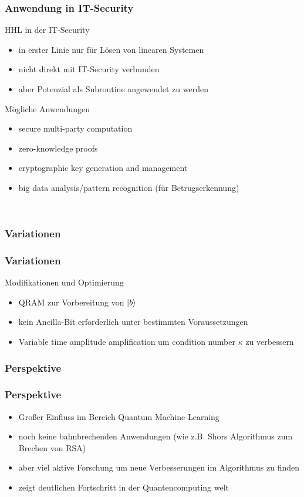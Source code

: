 \begin{frame}
    \frametitle{Anwendung in IT-Security}

    HHL in der IT-Security
    \begin{itemize}
        \item in erster Linie nur für Lösen von linearen Systemen
        \item nicht direkt mit IT-Security verbunden
        \item aber Potenzial als Subroutine angewendet zu werden
    \end{itemize}

    \hfil

    Mögliche Anwendungen
     \begin{itemize}
        \item secure multi-party computation 
        \item zero-knowledge proofs
        \item cryptographic key generation and management
        \item big data analysis/pattern recognition (für Betrugserkennung)

    \end{itemize}
\   
\end{frame}

\subsubsection{Variationen}
\begin{frame}
    \frametitle{Variationen}

    Modifikationen und Optimierung
    \begin{itemize}
        \item QRAM zur Vorbereitung von $\ket{b}$
        \item kein Ancilla-Bit erforderlich unter bestimmten Voraussetzungen 
        \item Variable time amplitude amplification um condition number $\kappa$ zu verbessern
    \end{itemize}
    
\end{frame}

\subsubsection{Perspektive}
\begin{frame}
    \frametitle{Perspektive}

    \begin{itemize}
        \item  Großer Einfluss im Bereich Quantum Machine Learning 
        \item  noch keine bahnbrechenden Anwendungen (wie z.B. Shors Algorithmus zum Brechen von RSA)
        \item  aber viel aktive Forschung um neue Verbesserungen im Algorithmus zu finden
        \item  zeigt deutlichen Fortschritt in der Quantencomputing welt
    \end{itemize}
    
\end{frame}

